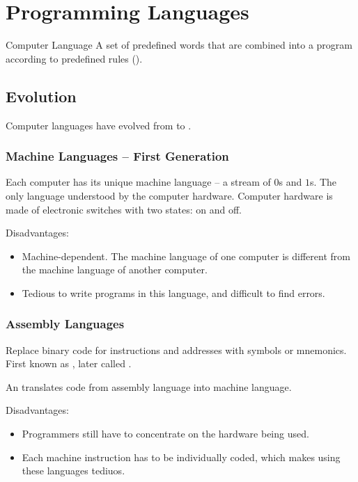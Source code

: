\documentclass[\main/notes.tex]{subfiles}
\begin{document}
	\ifSubfilesClassLoaded{\setcounter{chapter}{8}}{}
	\chapter{Programming Languages}
		\begin{definition}{Computer Language}
			A set of predefined words that are combined into a program according to predefined rules ().
		\end{definition}
		\section{Evolution}
			Computer languages have evolved from  to .
			\subsection{Machine Languages -- First Generation}
				Each computer has its unique machine language -- a stream of $0$s and $1$s. The only language understood by the computer hardware. Computer hardware is made of electronic switches with two states: on and off.

				Disadvantages:
				\begin{itemize}
					\item Machine-dependent. The machine language of one computer is different from the machine language of another computer.
					\item Tedious to write programs in this language, and difficult to find errors.
				\end{itemize}
			\subsection{Assembly Languages}
				Replace binary code for instructions and addresses with symbols or mnemonics. First known as , later called .

				An  translates code from assembly language into machine language.

				Disadvantages:
				\begin{itemize}
					\item Programmers still have to concentrate on the hardware being used.
					\item Each machine instruction has to be individually coded, which makes using these languages tediuos.
				\end{itemize}
\end{document}
